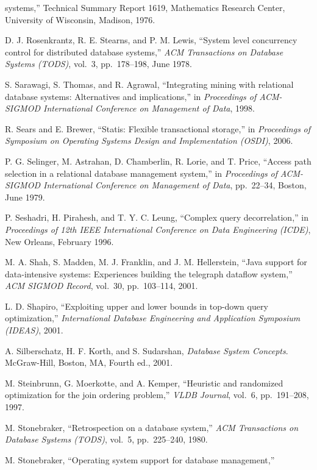 \documentclass[a4paper,11pt,twoside,openright]{book}
\begin{document}
\begin{enumerate}[label={[\arabic*]}]
  systems,'' Technical Summary Report 1619, Mathematics Research Center,
  University of Wisconsin, Madison, 1976.
\item
  D. J. Rosenkrantz, R. E. Stearns, and P. M. Lewis, ``System level
  concurrency control for distributed database systems,'' \emph{ACM
  Transactions on Database Systems (TODS)}, vol.~3, pp.~178--198, June
  1978.
\item
  S. Sarawagi, S. Thomas, and R. Agrawal, ``Integrating mining with
  relational database systems: Alternatives and implications,'' in
  \emph{Proceedings of ACM-SIGMOD International Conference on Management
  of Data}, 1998.
\item
  R. Sears and E. Brewer, ``Statis: Flexible transactional storage,'' in
  \emph{Proceedings} \emph{of Symposium on Operating Systems Design and
  Implementation (OSDI)}, 2006.
\item
  P. G. Selinger, M. Astrahan, D. Chamberlin, R. Lorie, and T. Price,
  ``Access path selection in a relational database management system,''
  in \emph{Proceedings of} \emph{ACM-SIGMOD International Conference on
  Management of Data}, pp.~22--34, Boston, June 1979.
\item
  P. Seshadri, H. Pirahesh, and T. Y. C. Leung, ``Complex query
  decorrelation,'' in \emph{Proceedings of 12th IEEE International
  Conference on Data Engineering} \emph{(ICDE)}, New Orleans, February
  1996.
\item
  M. A. Shah, S. Madden, M. J. Franklin, and J. M. Hellerstein, ``Java
  support for data-intensive systems: Experiences building the telegraph
  dataflow system,'' \emph{ACM SIGMOD Record}, vol.~30, pp.~103--114,
  2001.
\item
  L. D. Shapiro, ``Exploiting upper and lower bounds in top-down query
  optimization,'' \emph{International Database Engineering and
  Application Symposium} \emph{(IDEAS)}, 2001.
\item
  A. Silberschatz, H. F. Korth, and S. Sudarshan, \emph{Database System
  Concepts}. McGraw-Hill, Boston, MA, Fourth ed., 2001.
\item
  M. Steinbrunn, G. Moerkotte, and A. Kemper, ``Heuristic and randomized
  optimization for the join ordering problem,'' \emph{VLDB Journal},
  vol.~6, pp.~191--208, 1997.
\item
  M. Stonebraker, ``Retrospection on a database system,'' \emph{ACM
  Transactions on} \emph{Database Systems (TODS)}, vol.~5, pp.~225--240,
  1980.
\item
  M. Stonebraker, ``Operating system support for database management,''

\end{enumerate}
\end{document}
